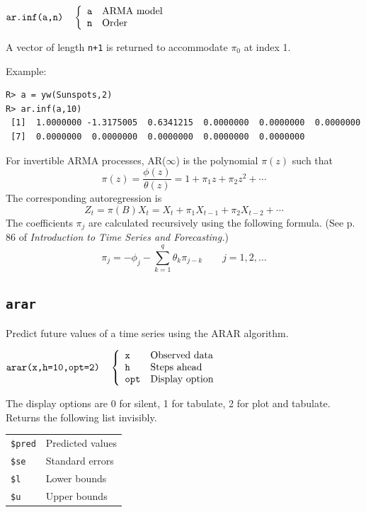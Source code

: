 \documentclass[11pt]{article}
\begin{document}
\bigskip
$
\hbox{\tt ar.inf(a,n)}\quad\left\{\begin{array}{ll}
{\tt a} & \hbox{ARMA model}\\
{\tt n} & \hbox{Order}
\end{array}\right.
$

\bigskip
\noindent
A vector of length {\tt n+1} is returned to accommodate $\pi_0$ at index 1.

\bigskip
\noindent
Example:

\begin{verbatim}
R> a = yw(Sunspots,2)
R> ar.inf(a,10)
 [1]  1.0000000 -1.3175005  0.6341215  0.0000000  0.0000000  0.0000000
 [7]  0.0000000  0.0000000  0.0000000  0.0000000  0.0000000
\end{verbatim}

\bigskip
\noindent
For invertible ARMA processes,
AR($\infty$) is the polynomial $\pi(z)$ such that
\[
\pi(z)=\frac{\phi(z)}{\theta(z)}=1+\pi_1z+\pi_2z^2+\cdots
\]
The corresponding autoregression is
\[
Z_t=\pi(B)X_t=X_t+\pi_1X_{t-1}+\pi_2X_{t-2}+\cdots
\]
The coefficients $\pi_j$ are calculated recursively using the following formula.
(See p. 86 of {\it Introduction to Time Series and Forecasting.})
\[
\pi_j=-\phi_j-\sum_{k=1}^q\theta_k\pi_{j-k}\qquad j=1,2,\ldots
\]

\newpage

\subsection{\tt arar}
Predict future values of a time series using the ARAR algorithm.

\bigskip
$
\hbox{\tt arar(x,h=10,opt=2)}\quad\left\{\begin{array}{ll}
{\tt x} & \hbox{Observed data}\\
{\tt h} & \hbox{Steps ahead}\\
{\tt opt} & \hbox{Display option}
\end{array}\right.
$

\bigskip
\noindent
The display options are 0 for silent, 1 for tabulate, 2 for plot and tabulate.
Returns the following list invisibly.

\begin{center}
\begin{tabular}{ll}
{\tt\$pred} & Predicted values\\
{\tt\$se} & Standard errors\\
{\tt\$l} & Lower bounds\\
{\tt\$u} & Upper bounds
\end{tabular}
\end{center}
\end{document}
